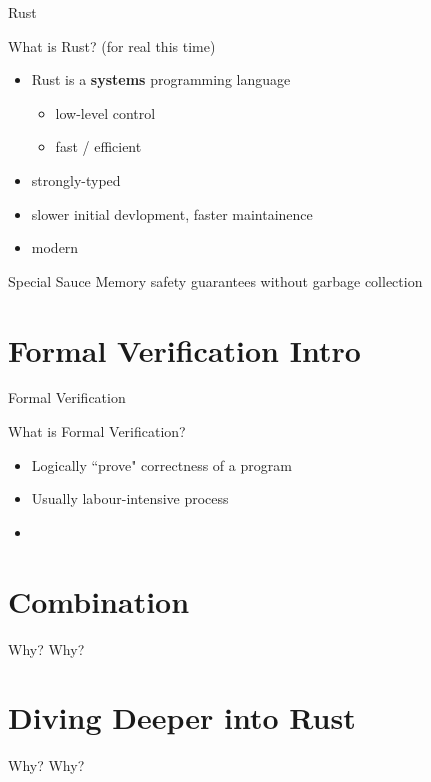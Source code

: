 \documentclass{beamer}
\begin{document}
\begin{frame}{Rust}
\begin{block}{What is Rust? (for real this time)}
\begin{itemize}
	\item Rust is a \textbf{systems} programming language
	\begin{itemize}
		\item low-level control
		\item fast / efficient
	\end{itemize}
	\item strongly-typed
	\item slower initial devlopment, faster maintainence
	\item modern
\end{itemize}
\end{block}
\begin{block}{Special Sauce} 
Memory safety guarantees without garbage collection
\end{block}
\end{frame}

\section{Formal Verification Intro}
\begin{frame}{Formal Verification}
\begin{block}{What is Formal Verification?}
\begin{itemize} 
	\item Logically ``prove" correctness of a program
	\item Usually labour-intensive process
	\item 
\end{itemize} 
\end{block}
\end{frame}


\section{Combination}
\begin{frame}{Why?}
Why? 
\end{frame}

\section{Diving Deeper into Rust}
\begin{frame}{Why?}
Why? 
\end{frame}
\end{document}
